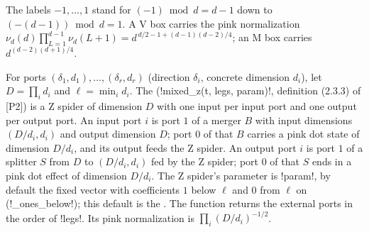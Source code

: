 \begin{center}
\end{center}

\noindent The labels $-1,\dots,1$ stand for $(-1)\bmod d=d-1$ down to $(-(d-1))\bmod d=1$. A V box carries the pink
normalization $\nu_d(d)\prod_{L=1}^{d-1}\nu_d(L+1)=d^{\,d/2-1+(d-1)(d-2)/4}$; an M box carries
$d^{(d-2)(d+1)/4}$.

\begin{definition}\label{def:completeness-mixedz}
For ports $(\delta_1,d_1),\dots,(\delta_r,d_r)$ (direction $\delta_i$, concrete dimension
$d_i$), let $D=\prod_i d_i$ and $\ell=\min_i d_i$. The 
(\py!mixed_z(t, legs, param)!, definition (2.3.3) of [P2]) is a Z spider of dimension $D$ with one
input per input port and one output per output port. An input port $i$ is port $1$ of a merger
$B$ with input dimensions $(D/d_i,d_i)$ and output dimension $D$; port $0$ of that $B$ carries a
pink dot state of dimension $D/d_i$, and its output feeds the Z spider. An output port $i$ is
port $1$ of a splitter $S$ from $D$ to $(D/d_i,d_i)$ fed by the Z spider; port $0$ of that $S$
ends in a pink dot effect of dimension $D/d_i$. The Z spider's parameter is \py!param!, by default
the fixed vector with coefficients $1$ below $\ell$ and $0$ from $\ell$ on (\py!_ones_below!); this
default is the . The function returns the external ports in the order of
\py!legs!. Its pink normalization is $\prod_i (D/d_i)^{-1/2}$.
\end{definition}


